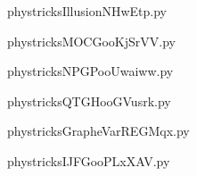 
    \newcommand{\CaptionFigIllusionNHwEtp}{<+Type your caption here+>}
    \begin{center}
        
    \end{center}
    phystricksIllusionNHwEtp.py

    

    \clearpage
    


    \newcommand{\CaptionFigMOCGooKjSrVV}{<+Type your caption here+>}
    \begin{center}
        
    \end{center}
    phystricksMOCGooKjSrVV.py

    

    \clearpage
    


    \newcommand{\CaptionFigNPGPooUwaiww}{<+Type your caption here+>}
    \begin{center}
        
    \end{center}
    phystricksNPGPooUwaiww.py

    

    \clearpage
    


    \newcommand{\CaptionFigQTGHooGVusrk}{<+Type your caption here+>}
    \begin{center}
        
    \end{center}
    phystricksQTGHooGVusrk.py

    

    \clearpage
    


    \newcommand{\CaptionFigGrapheVarREGMqx}{<+Type your caption here+>}
    \begin{center}
        
    \end{center}
    phystricksGrapheVarREGMqx.py

    

    \clearpage
    


    \newcommand{\CaptionFigIJFGooPLxXAV}{<+Type your caption here+>}
    \begin{center}
        
    \end{center}
    phystricksIJFGooPLxXAV.py

